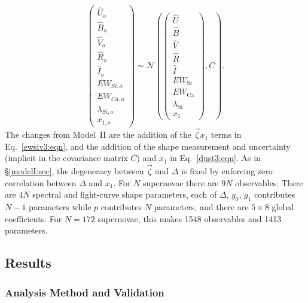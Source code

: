 \documentclass[trackchanges]{aastex62}   	%
\begin{document}
\begin{equation}
\begin{pmatrix}
{\hat{U}}_o\\{\hat{B}}_o\\ {\hat{V}}_o\\{\hat{R}}_o\\{\hat{I}}_o\\EW_{Si, o}\\ EW_{Ca, o} \\ \lambda_{Si, o} \\ x_{1, o}
\end{pmatrix}
\sim \mathcal{N}
\left(
\begin{pmatrix}
{\hat{U}}  \\{\hat{B}}  \\
{\hat{V}}\\{\hat{R}}\\{\hat{I}}\\
EW_{\mathrm{Si}}\\ EW_{\mathrm{Ca}} \\ \lambda_{\mathrm{Si}} \\ x_1
\end{pmatrix}
,C
\right).
\label{dust3:eqn}
\end{equation}
The changes from Model~II are the addition of the $\vec{\zeta} x_1$ terms in Eq.~\ref{ewsiv3:eqn}, and
the addition of the shape measurement and uncertainty (implicit in the covariance matrix $C$) and $x_1$   in Eq.~\ref{dust3:eqn}.
As in \S\ref{modelI:sec}, the degeneracy between $\vec{\zeta}$ and $\Delta$ is fixed by enforcing zero correlation between $\Delta$ and $x_1$.
For $N$ supernovae there are $9N$ observables.  There are $4N$ spectral and light-curve shape parameters, each of
$\Delta$, $g_0$, $g_1$ contributes $N-1$ parameters while $p$  contributes $N$ parameters,  and there are $5 \times 8$ global coefficients.
For $N=172$ supernovae, this makes 1548 observables and 1413  parameters.


\subsection{Results}
\subsubsection{Analysis Method and Validation}
\end{document}
